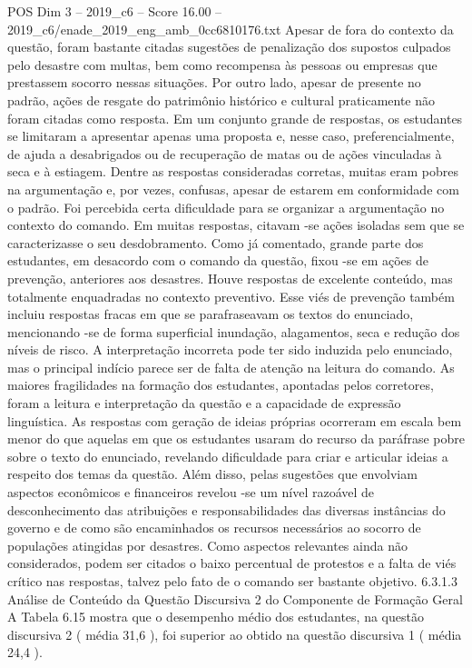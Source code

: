 \begin{textsample}{POS Dim 3 – 2019\_c6 – Score 16.00 – 2019\_c6/enade\_2019\_eng\_amb\_0cc6810176.txt}
Apesar de fora do contexto da questão, foram bastante citadas sugestões de penalização dos supostos culpados pelo desastre com multas, bem como recompensa às pessoas ou empresas que prestassem socorro nessas situações.
Por outro lado, apesar de presente no padrão, ações de resgate do patrimônio histórico e cultural praticamente não foram citadas como resposta.
Em um conjunto grande de respostas, os estudantes se limitaram a apresentar apenas uma proposta e, nesse caso, preferencialmente, de ajuda a desabrigados ou de recuperação de matas ou de ações vinculadas à seca e à estiagem.
Dentre as respostas consideradas corretas, muitas eram pobres na argumentação e, por vezes, confusas, apesar de estarem em conformidade com o padrão.
Foi percebida certa dificuldade para se organizar a argumentação no contexto do comando.
Em muitas respostas, citavam -se ações isoladas sem que se caracterizasse o seu desdobramento.
Como já comentado, grande parte dos estudantes, em desacordo com o comando da questão, fixou -se em ações de prevenção, anteriores aos desastres.
Houve respostas de excelente conteúdo, mas totalmente enquadradas no contexto preventivo.
Esse viés de prevenção também incluiu respostas fracas em que se parafraseavam os textos do enunciado, mencionando -se de forma superficial inundação, alagamentos, seca e redução dos níveis de risco.
A interpretação incorreta pode ter sido induzida pelo enunciado, mas o principal indício parece ser de falta de atenção na leitura do comando.
As maiores fragilidades na formação dos estudantes, apontadas pelos corretores, foram a leitura e interpretação da questão e a capacidade de expressão linguística.
As respostas com geração de ideias próprias ocorreram em escala bem menor do que aquelas em que os estudantes usaram do recurso da paráfrase pobre sobre o texto do enunciado, revelando dificuldade para criar e articular ideias a respeito dos temas da questão.
Além disso, pelas sugestões que envolviam aspectos econômicos e financeiros revelou -se um nível razoável de desconhecimento das atribuições e responsabilidades das diversas instâncias do governo e de como são encaminhados os recursos necessários ao socorro de populações atingidas por desastres.
Como aspectos relevantes ainda não considerados, podem ser citados o baixo percentual de protestos e a falta de viés crítico nas respostas, talvez pelo fato de o comando ser bastante objetivo. 6.3.1.3 Análise de Conteúdo da Questão Discursiva 2 do Componente de Formação Geral A Tabela 6.15 mostra que o desempenho médio dos estudantes, na questão discursiva 2 ( média 31,6 ), foi superior ao obtido na questão discursiva 1 ( média 24,4 ).

\end{textsample}
